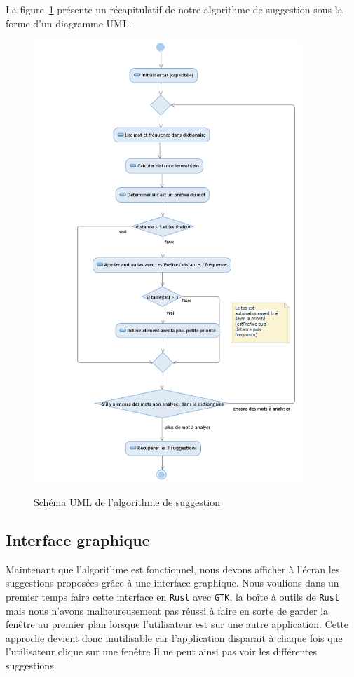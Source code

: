 \documentclass[a4paper, 11pt]{report}
\newcommand{\langage}[1]{\texttt{#1}}
\begin{document}
{La figure~\ref{fig:uml} présente un récapitulatif de notre algorithme de suggestion sous la forme d'un diagramme UML.\\
\begin{figure}[H]
	\begin{center}
		{\includegraphics[width=0.9\textwidth]{images/uml_algo.png}}
	\end{center}
	\caption{Schéma UML de l'algorithme de suggestion}
	\label{fig:uml}
\end{figure}

\newpage
\subsection{Interface graphique}

Maintenant que l'algorithme est fonctionnel, nous devons afficher à l'écran les suggestions proposées grâce à une interface graphique. Nous voulions dans un premier temps faire cette interface en \langage{Rust} avec \langage{GTK}, la boîte à outils de \langage{Rust}  mais nous n'avons malheureusement pas réussi à faire en sorte de garder la fenêtre au premier plan lorsque l'utilisateur est sur une autre application. Cette approche devient donc inutilisable car l'application disparait à chaque fois que l'utilisateur clique sur une fenêtre Il ne peut ainsi pas voir les différentes suggestions.\\

}
\end{document}
